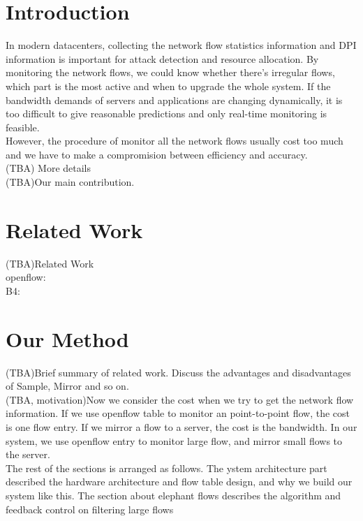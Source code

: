 \documentclass{acm_proc_article-sp}
\begin{document}


\section{Introduction}
In modern datacenters, collecting the network flow statistics information and DPI information is important for attack detection and resource allocation. By monitoring the network flows, we could know whether there's irregular flows, which part is the most active and when to upgrade the whole system. If the bandwidth demands of servers and applications are changing dynamically, it is too difficult to give reasonable predictions and only real-time monitoring is feasible.\\
However, the procedure of monitor all the network flows usually cost too much and we have to make a compromision between efficiency and accuracy.\\ 
(TBA) More details\\
(TBA)Our main contribution.\\


\section{Related Work}
(TBA)Related Work\\
openflow: \cite{openflow}\\
B4: \cite{google-b4} \\


\section{Our Method}
(TBA)Brief summary of related work. Discuss the advantages and disadvantages of Sample, Mirror and so on.\\
(TBA, motivation)Now we consider the cost when we try to get the network flow information. If we use openflow table to monitor an point-to-point flow, the cost is one flow entry. If we mirror a flow to a server, the cost is the bandwidth. In our system, we use openflow entry to monitor large flow, and mirror small flows to the server.\\
The rest of the sections is arranged as follows. The ystem architecture part described the hardware architecture and flow table design, and why we build our system like this.  The section about elephant flows describes the algorithm and feedback control on filtering large flows\\
\end{document}
